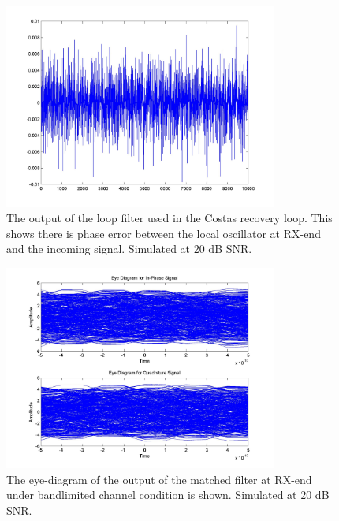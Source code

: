 \documentclass[]{article}
\begin{document}
\begin{figure}[H]
\centering
\includegraphics[width=0.8\textwidth]{loop_filter_qam20.jpg}
\caption{The output of the loop filter used in the Costas recovery loop.  This shows there is phase error between the local oscillator at RX-end and the incoming signal. Simulated at 20 dB SNR. \label{fig:qamLoop}}
\end{figure}

\begin{figure}[H]
\centering
\includegraphics[width=0.8\textwidth]{matched_eye_16qam20.jpg}
\caption{The eye-diagram of the output of the matched filter at RX-end under bandlimited channel condition is shown. Simulated at 20 dB SNR. \label{fig:qamEyeMatch}}
\end{figure}
\end{document}

